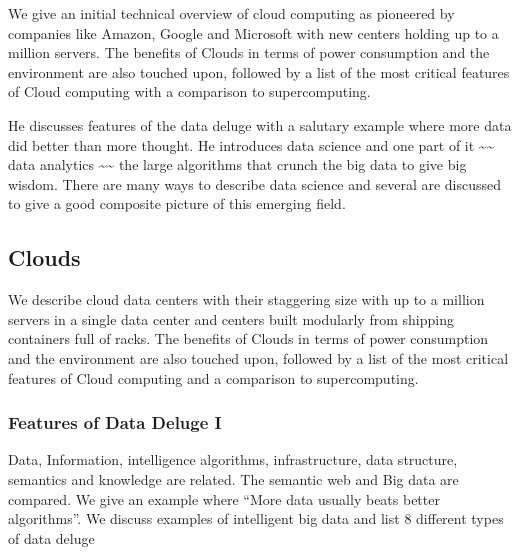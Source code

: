 We give an initial technical overview of cloud computing as pioneered by
companies like Amazon, Google and Microsoft with new centers holding up
to a million servers. The benefits of Clouds in terms of power
consumption and the environment are also touched upon, followed by a
list of the most critical features of Cloud computing with a comparison
to supercomputing.

He discusses features of the data deluge with a salutary example where
more data did better than more thought. He introduces data science and
one part of it \textasciitilde{}\textasciitilde{} data analytics
\textasciitilde{}\textasciitilde{} the large algorithms that crunch the
big data to give big wisdom. There are many ways to describe data
science and several are discussed to give a good composite picture of
this emerging field.




\subsection{Clouds}\label{clouds}

We describe cloud data centers with their staggering size with up to a
million servers in a single data center and centers built modularly from
shipping containers full of racks. The benefits of Clouds in terms of
power consumption and the environment are also touched upon, followed by
a list of the most critical features of Cloud computing and a comparison
to supercomputing.





\subsubsection{Features of Data Deluge I}\label{features-of-data-deluge-i}

Data, Information, intelligence algorithms, infrastructure, data
structure, semantics and knowledge are related. The semantic web and Big
data are compared. We give an example where ``More data usually beats
better algorithms''. We discuss examples of intelligent big data and
list 8 different types of data deluge





